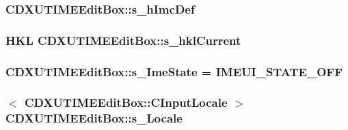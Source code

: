 \label{class_c_d_x_u_t_i_m_e_edit_box_a980f6732a5bd1fbf27e9d0feeaab3fca}
\hypertarget{class_c_d_x_u_t_i_m_e_edit_box_a8923bb4730fb126748d1d38da4de5ae2}{
\subsubsection[{s\_\-hImcDef}]{ {\bf CDXUTIMEEditBox::s\_\-hImcDef}}}
\label{class_c_d_x_u_t_i_m_e_edit_box_a8923bb4730fb126748d1d38da4de5ae2}
\hypertarget{class_c_d_x_u_t_i_m_e_edit_box_a1cc2b2c882ca9512ba1058c6c697f0ec}{
\subsubsection[{s\_\-hklCurrent}]{\setlength{\rightskip}{0pt plus 5cm}HKL {\bf CDXUTIMEEditBox::s\_\-hklCurrent}}}
\label{class_c_d_x_u_t_i_m_e_edit_box_a1cc2b2c882ca9512ba1058c6c697f0ec}
\hypertarget{class_c_d_x_u_t_i_m_e_edit_box_ac2c4d60cd29e91321145867d96d05605}{
\subsubsection[{s\_\-ImeState}]{ {\bf CDXUTIMEEditBox::s\_\-ImeState} = IMEUI\_\-STATE\_\-OFF}}
\label{class_c_d_x_u_t_i_m_e_edit_box_ac2c4d60cd29e91321145867d96d05605}
\hypertarget{class_c_d_x_u_t_i_m_e_edit_box_adbf262dfa3249b26d569dd04d4cdbb01}{
\subsubsection[{s\_\-Locale}]{$<$ {\bf CDXUTIMEEditBox::CInputLocale} $>$ {\bf CDXUTIMEEditBox::s\_\-Locale}}}
